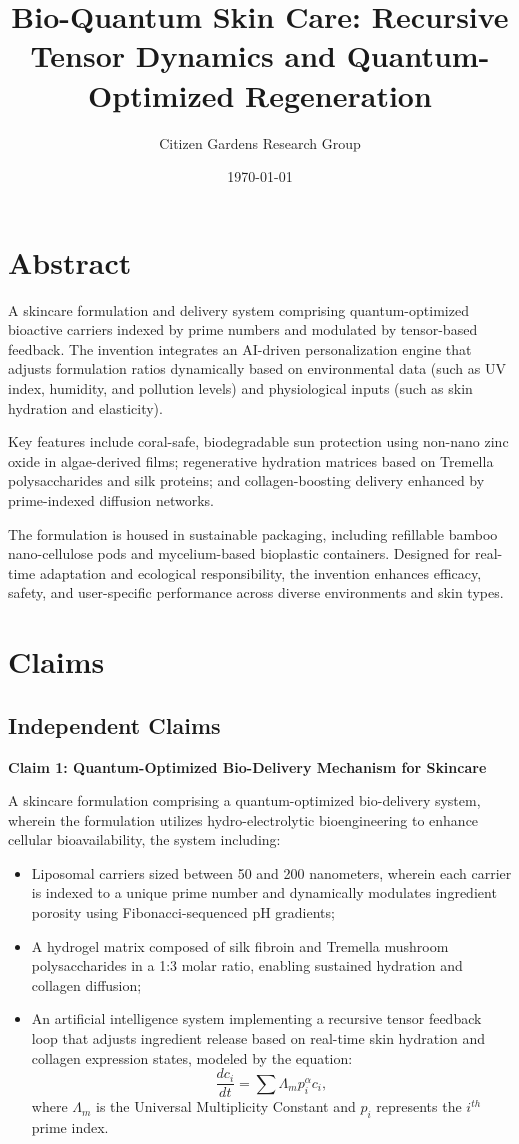 \documentclass{article}
\title{Bio-Quantum Skin Care: Recursive Tensor Dynamics and Quantum-Optimized Regeneration}
\author{Citizen Gardens Research Group}
\date{\today}
\theoremstyle{plain}
\theoremstyle{claimstyle}
\begin{document}
\maketitle

\section*{Abstract}

A skincare formulation and delivery system comprising quantum-optimized bioactive carriers indexed by prime numbers and modulated by tensor-based feedback. The invention integrates an AI-driven personalization engine that adjusts formulation ratios dynamically based on environmental data (such as UV index, humidity, and pollution levels) and physiological inputs (such as skin hydration and elasticity). 

Key features include coral-safe, biodegradable sun protection using non-nano zinc oxide in algae-derived films; regenerative hydration matrices based on Tremella polysaccharides and silk proteins; and collagen-boosting delivery enhanced by prime-indexed diffusion networks. 

The formulation is housed in sustainable packaging, including refillable bamboo nano-cellulose pods and mycelium-based bioplastic containers. Designed for real-time adaptation and ecological responsibility, the invention enhances efficacy, safety, and user-specific performance across diverse environments and skin types.


\section{Claims}

\subsection*{Independent Claims}

\textbf{Claim 1: Quantum-Optimized Bio-Delivery Mechanism for Skincare}  

A skincare formulation comprising a quantum-optimized bio-delivery system, wherein the formulation utilizes hydro-electrolytic bioengineering to enhance cellular bioavailability, the system including:  
\begin{itemize}
    \item Liposomal carriers sized between 50 and 200 nanometers, wherein each carrier is indexed to a unique prime number and dynamically modulates ingredient porosity using Fibonacci-sequenced pH gradients;
    \item A hydrogel matrix composed of silk fibroin and Tremella mushroom polysaccharides in a 1:3 molar ratio, enabling sustained hydration and collagen diffusion;
    \item An artificial intelligence system implementing a recursive tensor feedback loop that adjusts ingredient release based on real-time skin hydration and collagen expression states, modeled by the equation:
    \[
    \frac{dc_i}{dt} = \sum \Lambda_m p_i^\alpha c_i,
    \]
    where \( \Lambda_m \) is the Universal Multiplicity Constant and \( p_i \) represents the \( i^{th} \) prime index.
\end{itemize}
\end{document}

